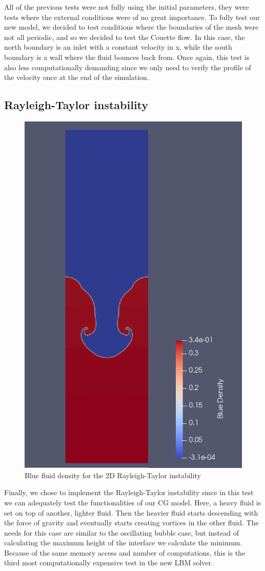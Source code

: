 \documentclass[12pt, openany]{book}
\begin{document}
All of the previous tests were not fully using the initial parameters, they were tests where the external conditions were of no great importance. To fully test our new model, we decided to test conditions where the boundaries of the mesh were not all periodic, and so we decided to test the Couette flow. In this case, the north boundary is an inlet with a constant velocity in x, while the south boundary is a wall where the fluid bounces back from. Once again, this test is also less computationally demanding since we only need to verify the profile of the velocity once at the end of the simulation. 

\subsection{Rayleigh-Taylor instability}
\begin{figure}[H]
	\centering
	\includegraphics[width=0.5\linewidth]{Resources/Images/rt.png}
	\caption{Blue fluid density for the 2D Rayleigh-Taylor instability}
	\label{fig:rt}
\end{figure}
Finally, we chose to implement the Rayleigh-Taylor instability since in this test we can adequately test the functionalities of our CG model. Here, a heavy fluid is set on top of another, lighter fluid. Then the heavier fluid starts descending with the force of gravity and eventually starts creating vortices in the other fluid. The needs for this case are similar to the oscillating bubble case, but instead of calculating the maximum height of the interface we calculate the minimum. Because of the same memory access and number of computations, this is the third most computationally expensive test in the new LBM solver.
\end{document}
